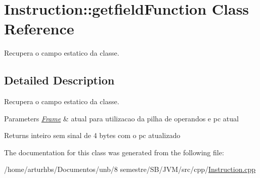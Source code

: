 \hypertarget{classInstruction_1_1getfieldFunction}{}\section{Instruction\+:\+:getfield\+Function Class Reference}
\label{classInstruction_1_1getfieldFunction}


Recupera o campo estatico da classe.  




\subsection{Detailed Description}
Recupera o campo estatico da classe. 


\begin{DoxyParams}{Parameters}
{\em \hyperlink{classFrame}{Frame}} & atual para utilizacao da pilha de operandos e pc atual \\
\hline
\end{DoxyParams}
\begin{DoxyReturn}{Returns}
inteiro sem sinal de 4 bytes com o pc atualizado 
\end{DoxyReturn}


The documentation for this class was generated from the following file\+:\begin{DoxyCompactItemize}
\item 
/home/arturhbs/\+Documentos/unb/8 semestre/\+S\+B/\+J\+V\+M/src/cpp/\hyperlink{Instruction_8cpp}{Instruction.\+cpp}\end{DoxyCompactItemize}
